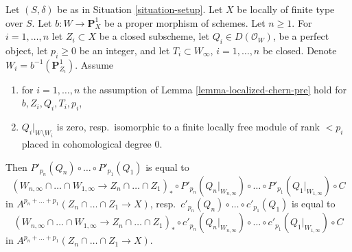 \begin{lemma}
\label{lemma-homomorphism-final}
Let $(S, \delta)$ be as in Situation \ref{situation-setup}. Let $X$ be
locally of finite type over $S$. Let $b : W \longrightarrow \mathbf{P}^1_X$
be a proper morphism of schemes. Let $n \geq 1$. For $i = 1, \ldots, n$
let $Z_i \subset X$ be a closed subscheme, let $Q_i \in D(\mathcal{O}_W)$,
be a perfect object, let $p_i \geq 0$ be an integer, and let
$T_i \subset W_\infty$, $i = 1, \ldots, n$ be closed.
Denote $W_i = b^{-1}(\mathbf{P}^1_{Z_i})$. Assume
\begin{enumerate}
\item for $i = 1, \ldots, n$ the assumption of
Lemma \ref{lemma-localized-chern-pre} hold for
$b, Z_i, Q_i, T_i, p_i$,
\item $Q_i|_{W \setminus W_i}$ is zero, resp.\ isomorphic to a finite
locally free module of rank $< p_i$ placed in cohomological degree $0$.
\end{enumerate}
Then $P'_{p_n}(Q_n) \circ \ldots \circ P'_{p_1}(Q_1)$ is equal to
$$
(W_{n, \infty} \cap \ldots \cap W_{1, \infty} \to
Z_n \cap \ldots \cap Z_1)_* \circ
P'_{p_n}(Q_n|_{W_{n, \infty}}) \circ \ldots \circ P'_{p_1}(Q_1|_{W_{1, \infty}})
\circ C
$$
in $A^{p_n + \ldots + p_1}(Z_n \cap \ldots \cap Z_1 \to X)$,
resp.\ $c'_{p_n}(Q_n) \circ \ldots \circ c'_{p_1}(Q_1)$ is equal to
$$
(W_{n, \infty} \cap \ldots \cap W_{1, \infty} \to
Z_n \cap \ldots \cap Z_1)_* \circ
c'_{p_n}(Q_n|_{W_{n, \infty}}) \circ \ldots \circ c'_{p_1}(Q_1|_{W_{1, \infty}})
\circ C
$$
in $A^{p_n + \ldots + p_1}(Z_n \cap \ldots \cap Z_1 \to X)$.
\end{lemma}

